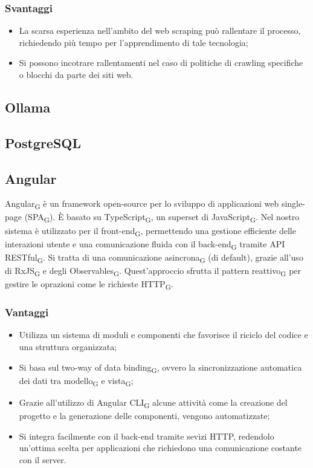 \subsubsection{Svantaggi}
\begin{itemize}
    \item La scarsa esperienza nell'ambito del web scraping può rallentare il processo, richiedendo più tempo per l'apprendimento di tale tecnologia;
    \item Si possono incotrare rallentamenti nel caso di politiche di crawling specifiche o blocchi da parte dei siti web.
\end{itemize}

\subsection{Ollama}

\subsection{PostgreSQL}

\subsection{Angular}
Angular\textsubscript{G} è un framework open-source per lo sviluppo di applicazioni web single-page (SPA\textsubscript{G}). È basato su TypeScript\textsubscript{G}, un superset di JavaScript\textsubscript{G}. Nel nostro sistema è utilizzato per il front-end\textsubscript{G}, permettendo una gestione efficiente delle interazioni utente e una comunicazione fluida con il back-end\textsubscript{G} tramite API RESTful\textsubscript{G}. Si tratta di una comunicazione asincrona\textsubscript{G} (di default), grazie all'uso di RxJS\textsubscript{G} e degli Observables\textsubscript{G}. Quest'approccio sfrutta il pattern reattivo\textsubscript{G} per gestire le oprazioni come le richieste HTTP\textsubscript{G}. 
\subsubsection{Vantaggi}
\begin{itemize}
    \item Utilizza un sistema di moduli e componenti che favorisce il riciclo del codice e una struttura organizzata;
    \item Si basa sul two-way of data binding\textsubscript{G}, ovvero la sincronizzazione automatica dei dati tra modello\textsubscript{G} e vista\textsubscript{G};
    \item Grazie all'utilizzo di Angular CLI\textsubscript{G} alcune attività come la creazione del progetto e la generazione delle componenti, vengono automatizzate;
    \item Si integra facilmente con il back-end tramite sevizi HTTP, redendolo un'ottima scelta per applicazioni che richiedono una comunicazione costante con il server.
\end{itemize}
